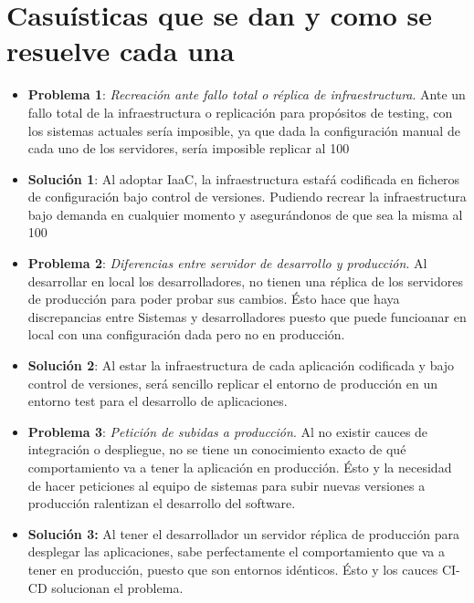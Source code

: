 \section{Casuísticas que se dan y como se resuelve cada una}
		\begin{itemize}
			\item \textbf{Problema 1}: \textit{Recreación ante fallo total o réplica de infraestructura}. Ante un fallo total de la infraestructura o replicación para propósitos de testing, con los sistemas actuales sería imposible, ya que dada la configuración manual de cada uno de los servidores, sería imposible replicar al 100%
			\item  \textbf {Solución 1}: Al adoptar IaaC, la infraestructura estaŕá codificada en ficheros de configuración bajo control de versiones. Pudiendo recrear la infraestructura bajo demanda en cualquier momento y asegurándonos de que sea la misma al 100%
			\item \textbf{Problema 2}: \textit{Diferencias entre servidor de desarrollo y producción}. Al desarrollar en local los desarrolladores, no tienen una réplica de los servidores de producción para poder probar sus cambios. Ésto hace que haya discrepancias entre Sistemas y desarrolladores puesto que puede funcioanar en local con una configuración dada pero no en producción. 
			\item \textbf {Solución 2}: Al estar la infraestructura de cada aplicación codificada y bajo control de versiones, será sencillo replicar el entorno de producción en un entorno test para el desarrollo de aplicaciones.
			\item \textbf{Problema 3}: \textit{Petición de subidas a producción}. Al no existir cauces de integración o despliegue, no se tiene un conocimiento exacto de qué comportamiento va a tener la aplicación en producción. Ésto y la necesidad de hacer peticiones al equipo de sistemas para subir nuevas versiones a producción ralentizan el desarrollo del software.
			\item \textbf{Solución 3:} Al tener el desarrollador un servidor réplica de producción para desplegar las aplicaciones, sabe perfectamente el comportamiento que va a tener en producción, puesto que son entornos idénticos. Ésto y los cauces CI-CD solucionan el problema.
		\end{itemize}

